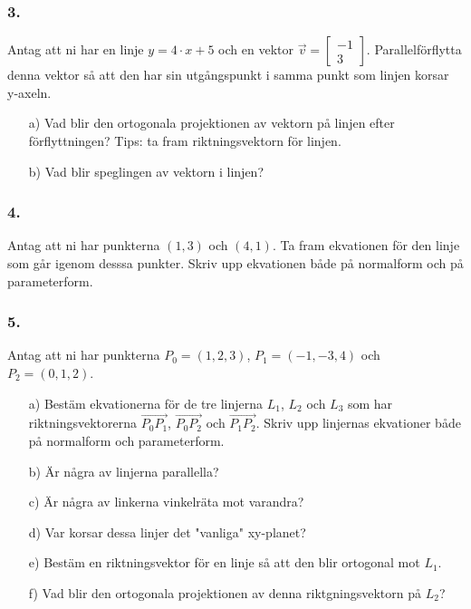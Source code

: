 \documentclass{article}
\begin{document}
\subsubsection*{3.}
Antag att ni har en linje $y = 4 \cdot x + 5$ och en vektor $\vec{v} = \begin{bmatrix} -1 \\ 3 \end{bmatrix}$. Parallelförflytta denna vektor så att den har sin utgångspunkt i samma punkt som linjen korsar y-axeln.
\begin{itemize}
\item[a) ] Vad blir den ortogonala projektionen av vektorn på linjen efter förflyttningen? Tips: ta fram riktningsvektorn för linjen. 
\item[b) ] Vad blir speglingen av vektorn i linjen?
\end{itemize}

\subsubsection*{4.}
Antag att ni har punkterna $(1,3)$ och $(4,1)$. Ta fram ekvationen för den linje som går igenom desssa punkter. Skriv upp ekvationen både på normalform och på parameterform.  

\subsubsection*{5.}
Antag att ni har punkterna $P_0 = (1,2,3)$, $P_1 = (-1,-3,4)$ och $P_2 = (0,1,2)$.
\begin{itemize}
\item[a) ] Bestäm ekvationerna för de tre linjerna $L_1$, $L_2$ och $L_3$ som har riktningsvektorerna $\vec{P_0 P_1}$, $\vec{P_0 P_2}$ och $\vec{P_1 P_2}$. Skriv upp linjernas ekvationer både på normalform och parameterform. 
\item[b) ] Är några av linjerna parallella?
\item[c) ] Är några av linkerna vinkelräta mot varandra?
\item[d) ] Var korsar dessa linjer det "vanliga" xy-planet?
\item[e) ] Bestäm en riktningsvektor för en linje så att den blir ortogonal mot $L_1$. 
\item[f) ] Vad blir den ortogonala projektionen av denna riktgningsvektorn på $L_2$?
\end{itemize}
\end{document}
